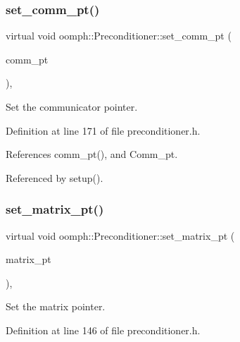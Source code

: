 \subsubsection{\texorpdfstring{set\+\_\+comm\+\_\+pt()}{set\_comm\_pt()}}
{\footnotesize\ttfamily virtual void oomph\+::\+Preconditioner\+::set\+\_\+comm\+\_\+pt (\begin{DoxyParamCaption}\item[{const \hyperlink{classoomph_1_1OomphCommunicator}{Oomph\+Communicator} $\ast$const}]{comm\+\_\+pt }\end{DoxyParamCaption})\hspace{0.3cm}{\ttfamily [inline]}, {\ttfamily [virtual]}}



Set the communicator pointer. 



Definition at line 171 of file preconditioner.\+h.



References comm\+\_\+pt(), and Comm\+\_\+pt.



Referenced by setup().

\mbox{\label{classoomph_1_1Preconditioner_af459b7333c4c64435fd8fa933535901f}} 
\subsubsection{\texorpdfstring{set\+\_\+matrix\+\_\+pt()}{set\_matrix\_pt()}}
{\footnotesize\ttfamily virtual void oomph\+::\+Preconditioner\+::set\+\_\+matrix\+\_\+pt (\begin{DoxyParamCaption}\item[{\hyperlink{classoomph_1_1DoubleMatrixBase}{Double\+Matrix\+Base} $\ast$}]{matrix\+\_\+pt }\end{DoxyParamCaption})\hspace{0.3cm}{\ttfamily [inline]}, {\ttfamily [virtual]}}



Set the matrix pointer. 



Definition at line 146 of file preconditioner.\+h.



